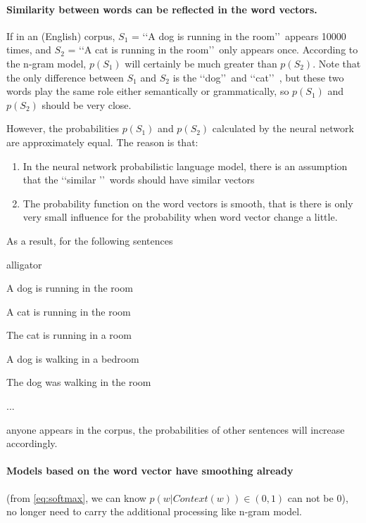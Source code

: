 \paragraph{Similarity between words can be reflected in the word vectors.}

If in an (English) corpus, $S_1$ = \lq\lq A dog is running in the room\rq\rq\ appears 10000 times, and $S_2$ = \lq\lq A cat is running in the room\rq\rq\ only appears once. According to the n-gram model, $p(S_1)$ will certainly be much greater than $p(S_2)$. Note that the only difference between $S_1$ and $S_2$ is the \lq\lq dog\rq\rq\ and \lq\lq cat\rq\rq\ , but these two words play the same role either semantically or grammatically, so $p(S_1)$ and $p(S_2)$ should be very close.

However, the probabilities $p(S_1)$ and $p(S_2)$ calculated by the neural network are approximately equal. The reason is that: 
\begin{enumerate}
\item In the neural network probabilistic language model, there is an assumption that the \lq\lq similar \rq\rq\ words should have similar vectors 
\item The probability function on the word vectors is smooth, that is there is only very small influence for the probability when word vector change a little. 
\end{enumerate}
As a result, for the following sentences
\begin{labeling}{alligator}
\item [\tab A dog is running in the room] 
\item [\tab A cat is running in the room]
\item [\tab The cat is running in a room] 
\item [\tab A dog is walking in a bedroom] 
\item [\tab The dog was walking in the room] 
\item [\tab \tab ...] 
\end{labeling}
anyone appears in the corpus, the probabilities of other sentences will increase accordingly.
\paragraph{Models based on the word vector have smoothing already} 
 (from \ref{eq:softmax}, we can know $p(w|Context(w))\in(0,1)$ can not be $0$), no longer need to carry the additional processing like n-gram model.



